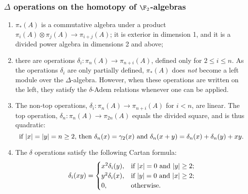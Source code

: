 \documentclass[10pt]{article}
\begin{document}
\begin{SteenrodAlgebrasAndTheirKoszulDuals}
\subsubsection{$\Delta$ operations on the homotopy of $\F_2$-algebras}
\begin{enumerate}\squishlist
\setlength{\parindent}{.25in}
\item $\pi_*(A)$ is a commutative algebra under a product $\pi_i(A)\otimes \pi_j(A)\to \pi_{i+j}(A)$; it is exterior in dimension 1, and it is a divided power algebra in dimensions 2 and above;
\item there are operations $\delta_i:\pi_n(A)\to \pi_{n+i}(A)$, defined only for $2\leq i\leq n$. 
As the operations $\delta_i$ are only partially defined, $\pi_*(A)$ does \emph{not} become a left module over the $\Delta$-algebra.
 However, when these operations are written on the left, they satisfy the $\delta$-Adem relations whenever one can be applied.
\item The non-top operations, $\delta_i:\pi_n(A)\to \pi_{n+i}(A)$ for $i<n$, are linear. The top operation, $\delta_n:\pi_n(A)\to \pi_{2n}(A)$ equals the divided square, and is thus quadratic:
\[\textup{if $|x|=|y|=n\geq2$, then }\delta_n(x)=\gamma_2(x)\textup{ and }\delta_n(x+y)=\delta_n(x)+\delta_n(y)+xy.\]
\item The $\delta$ operations satisfy the following Cartan formula:
\[\delta_i(xy)=\begin{cases}
x^2\delta_i(y),&\textup{if }|x|=0\textup{ and }|y|\geq2;\\
y^2\delta_i(x),&\textup{if }|y|=0\textup{ and }|x|\geq2;\\
0,&\textup{otherwise}.
\end{cases}
\]
\end{enumerate}

\end{SteenrodAlgebrasAndTheirKoszulDuals}
\end{document}
